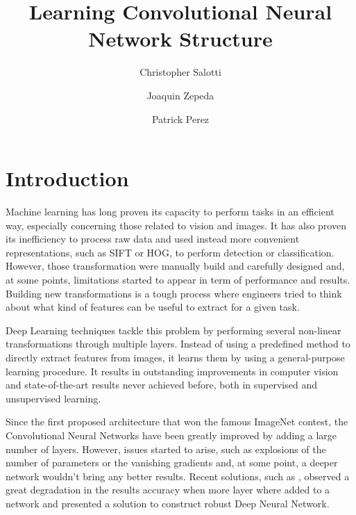 \documentclass{winnower}
\begin{document}
\title{Learning Convolutional Neural Network Structure}

\author{Christopher Salotti}
\author{Joaquin Zepeda}
\author{Patrick Perez}



\date{}

\maketitle




\section{Introduction}
Machine learning has long proven its capacity to perform tasks in an efficient way, especially concerning those related to vision and images. It has also proven its inefficiency to process raw data and used instead more convenient representations, such as SIFT or HOG, to perform detection or classification. However, those transformation were manually build and carefully designed and, at some points, limitations started to appear in term of performance and results. Building new transformations is a tough process where engineers tried to think about what kind of features can be useful to extract for a given task.

Deep Learning techniques tackle this problem by performing several non-linear transformations through multiple layers.  
Instead of using a predefined method to directly extract features from images, it learns them by using a general-purpose learning procedure. It results in outstanding improvements in computer vision and state-of-the-art results never achieved before, both in supervised and unsupervised learning. 

Since the first proposed architecture \cite{krizhevsky2012imagenet} that won the famous ImageNet contest, the Convolutional Neural Networks have been greatly improved by adding a large number of layers. However, issues started to arise, such as explosions of the number of parameters or the vanishing gradients and, at some point, a deeper network wouldn't bring any better results. Recent solutions, such as \cite{he2015deep}, observed a great degradation in the results accuracy when more layer where added to a network and presented a solution to construct robust Deep Neural Network. 
\end{document}
